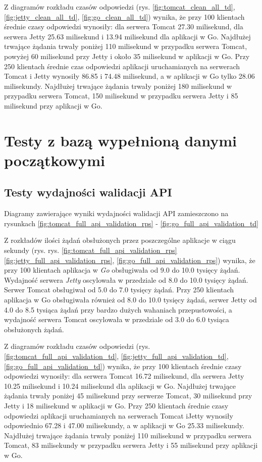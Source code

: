 Z diagramów rozkładu czasów odpowiedzi (rys. \ref{fig:tomcat_clean_all_td}, \ref{fig:jetty_clean_all_td}, \ref{fig:go_clean_all_td}) wynika, że przy 100 klientach średnie czasy odpowiedzi wynosiły: dla serwera Tomcat 27.30  milisekund, dla serwera Jetty 25.63 milisekund i 13.94 milisekund dla aplikacji w Go.  Najdłużej trwające żądania trwały poniżej 110 milisekund w przypadku serwera Tomcat, powyżej 60 milisekund przy Jetty i około 35 milisekund  w aplikacji w Go. Przy 250 klientach średnie czas odpowiedzi aplikacji uruchamianych na serwerach Tomcat i Jetty wynosiły 86.85 i 74.48 milisekund, a w aplikacji w Go tylko 28.06 milisekundy. Najdłużej trwające żądania trwały poniżej 180 milisekund w przypadku serwera Tomcat, 150 milisekund w przypadku serwera Jetty i 85 milisekund przy aplikacji w Go. 

% 
\clearpage

\newpage
\section{Testy z bazą wypełnioną danymi początkowymi}
\subsection{Testy wydajności walidacji API}
Diagramy zawierające wyniki wydajności walidacji API zamieszczono na rysunkach \ref{fig:tomcat_full_api_validation_rps} - \ref{fig:go_full_api_validation_td}

Z rozkładów ilości żądań obsłużonych przez poszczególne aplikacje w ciągu sekundy (rys. rys. \ref{fig:tomcat_full_api_validation_rps} \ref{fig:jetty_full_api_validation_rps}, \ref{fig:go_full_api_validation_rps}) wynika, że przy 100 klientach aplikacja  w \textsl{Go} obsługiwała od 9.0 do 10.0 tysięcy żądań. Wydajność serwera  \textsl{Jetty} oscylowała w przedziale od 8.0 do 10.0 tysięcy żądań. Serwer Tomcat obsługiwał od 5.0 do 7.0 tysięcy żądań. Przy 250 klientach aplikacja w Go obsługiwała również od 8.0 do 10.0 tysięcy żądań, serwer Jetty od 4.0 do 8.5 tysiąca żądań przy bardzo dużych wahaniach przepustowości, a wydajność serwera Tomcat oscylowała w przedziale od 3.0 do 6.0 tysiąca obsłużonych żądań. 
 
Z diagramów rozkładu czasów odpowiedzi (rys. \ref{fig:tomcat_full_api_validation_td}, \ref{fig:jetty_full_api_validation_td}, \ref{fig:go_full_api_validation_td}) wynika, że przy 100 klientach średnie czasy odpowiedzi wynosiły: dla serwera Tomcat 16.72 milisekund, dla serwera Jetty 10.25 milisekund i 10.24 milisekund dla aplikacji w Go. Najdłużej trwające żądania trwały poniżej 45 milisekund przy serwerze Tomcat, 30 milisekund przy Jetty i 18 milisekund w aplikacji w Go. Przy 250 klientach średnie czasy odpowiedzi aplikacji uruchamianych na serwerach Tomcat iJetty wynosiły odpowiednio 67.28 i 47.00 milisekundy, a w aplikacji w Go 25.33 milisekundy. Najdłużej trwające żądania trwały poniżej 110 milisekund w przypadku serwera Tomcat, 83 milisekundy w przypadku serwera Jetty i 55 milisekund przy aplikacji w Go. 

